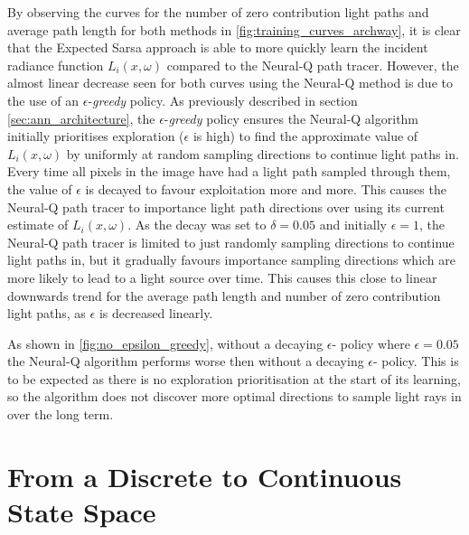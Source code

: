 \documentclass[../dissertation.tex]{subfiles}
\begin{document}
By observing the curves for the number of zero contribution light paths and average path length for both methods in \ref{fig:training_curves_archway}, it is clear that the Expected Sarsa approach is able to more quickly learn the incident radiance function $L_i(x, \omega)$ compared to the Neural-Q path tracer. However, the almost linear decrease seen for both curves using the Neural-Q method is due to the use of an $\epsilon$-\textit{greedy} policy. As previously described in section \ref{sec:ann_architecture}, the $\epsilon$-\textit{greedy} policy ensures the Neural-Q algorithm initially prioritises exploration ($\epsilon$ is high) to find the approximate value of $L_i(x,\omega)$ by uniformly at random sampling directions to continue light paths in. Every time all pixels in the image have had a light path sampled through them, the value of $\epsilon$ is decayed to favour exploitation more and more. This causes the Neural-Q path tracer to importance light path directions over using its current estimate of $L_i(x, \omega)$. As the decay was set to $\delta = 0.05$ and initially $\epsilon = 1$, the Neural-Q path tracer is limited to just randomly sampling directions to continue light paths in, but it gradually favours importance sampling directions which are more likely to lead to a light source over time. This causes this close to linear downwards trend for the average path length and number of zero contribution light paths, as $\epsilon$ is decreased linearly. 



As shown in \ref{fig:no_epsilon_greedy}, without a decaying $\epsilon$- policy where $\epsilon = 0.05$ the Neural-Q algorithm performs worse then without a decaying $\epsilon$- policy. This is to be expected as there is no exploration prioritisation at the start of its learning, so the algorithm does not discover more optimal directions to sample light rays in over the long term.

\section{From a Discrete to Continuous State Space}
\end{document}
